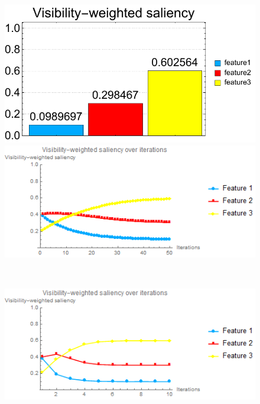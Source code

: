 \begin{figure}
\begin{minipage}{.25\textwidth}
		\subcaption{}
	\end{minipage}~
	\begin{minipage}{.25\textwidth}
		\includegraphics[width=1\linewidth]{figures/tooth_naive_optimized_linesearch_visibility_saliency_weighted_chart}
		\subcaption{}
	\end{minipage}
	
	\begin{minipage}{.49\textwidth}
		\includegraphics[width=1\linewidth]{images/tooth_naive_saliency_fixed}
		\subcaption{}
	\end{minipage}~
	\begin{minipage}{.49\textwidth}
		\includegraphics[width=1\linewidth]{images/tooth_naive_saliency_parallelsearch}
		\subcaption{}
	\end{minipage}
	

\end{figure}
